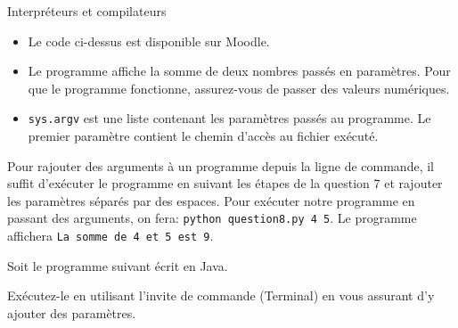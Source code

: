 \begin{section}{Interpréteurs et compilateurs}
\begin{Exercice}[10 minutes]
        
        
        \begin{conseil}
            \begin{itemize}
                \item Le code ci-dessus est disponible sur Moodle.
                \item Le programme affiche la somme de deux nombres passés en paramètres. Pour que le programme fonctionne, assurez-vous de passer des valeurs numériques.
                \item \lstinline{sys.argv} est une liste contenant les paramètres passés au programme. Le premier paramètre contient le chemin d'accès au fichier exécuté.
            \end{itemize}
        \end{conseil}

        \begin{solution}
            Pour rajouter des arguments à un programme depuis la ligne de commande, il suffit d'exécuter le programme en suivant les étapes de la question 7 et rajouter les paramètres séparés par des espaces. Pour exécuter notre programme en passant des arguments, on fera: \lstinline{python question8.py 4 5}. Le programme affichera \lstinline{La somme de 4 et 5 est 9}.
        \end{solution}

    \end{Exercice}
\newpage
    \begin{Exercice}[10 minutes]
        Soit le programme suivant écrit en Java. 

        
        
        Exécutez-le en utilisant l'invite de commande (Terminal) en vous assurant d'y ajouter des paramètres.
    


\end{Exercice}
\end{section}
